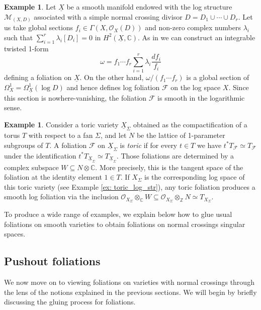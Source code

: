 \documentclass[reqno]{amsart}
\newcommand\C{\mathbb{C}}
\newcommand\Z{\mathbb{Z}}
\newcommand{\OO}{\mathcal{O}}
\newcommand{\F}{\mathscr{F}}
\newcommand{\M}{\mathcal{M}}
\theoremstyle{definition}
\newtheorem{example}[theorem]{Example}
\theoremstyle{named}
\begin{document}
\begin{example}
Let $\underline{X}$ be a smooth manifold endowed with the log structure $\M_{(X,D)}$ associated with a simple normal crossing divisor $D = D_1\cup\cdots\cup D_r$.  Let us take global sections $f_i\in\Gamma(X,\OO_X(D))$ and non-zero complex numbers $\lambda_i$ such that $\sum_{i=1}^r \lambda_i [D_i] = 0$ in $H^2(\underline{X},\C)$. As in \cite{calvo1994irreducible} we can construct an integrable twisted 1-form $$\omega = f_1\cdots f_r \sum_{i=1}^r \lambda_i \frac{df_i}{f_i}$$
defining a foliation on $\underline{X}$. On the other hand, $\omega/(f_1\cdots f_r)$ is a global section of $\Omega^1_X = \Omega^1_{\underline{X}}(\log D)$ and hence defines log foliation $\F$ on the log space $X$. Since this section is nowhere-vanishing, the foliation $\F$ is smooth in the logarithmic sense. 
\end{example}

\begin{example}
Consider a toric variety $\underline{X}_\Sigma$ obtained as the compactification of a torus $T$ with respect to a fan $\Sigma$, and let $N$ be the lattice of 1-parameter subgroups of $T$. A foliation $\F$ on $\underline{X}_\Sigma$ is \textit{toric} if for every $t\in T$ we have $t^\ast T_\F\simeq T_\F$ under the identification $t^\ast T_{\underline{X}_\Sigma}\simeq T_{\underline{X}_\Sigma}$. Those foliations are determined by a complex subspace $W\subseteq N\otimes \C$. More precisely, this is the tangent space of the foliation at the identity element $1\in T$. If $X_\Sigma$ is the corresponding log space of this toric variety (see Example \ref{ex: toric_log_str}),  any toric foliation produces a smooth log foliation via the inclusion $\OO_{X_\Sigma}\otimes_\C W\subseteq \OO_{X_\Sigma}\otimes_\Z N \simeq T_{X_\Sigma}$.
 \end{example}
 
To produce a wide range of examples, we explain below how to glue usual foliations on smooth varieties to obtain foliations on normal crossings singular spaces.

\subsection{Pushout  foliations}

We now move on to viewing foliations on varieties with normal crossings through the lens of the notions explained in the previous sections.
We will begin by briefly discussing the gluing process for foliations.
\end{document}
